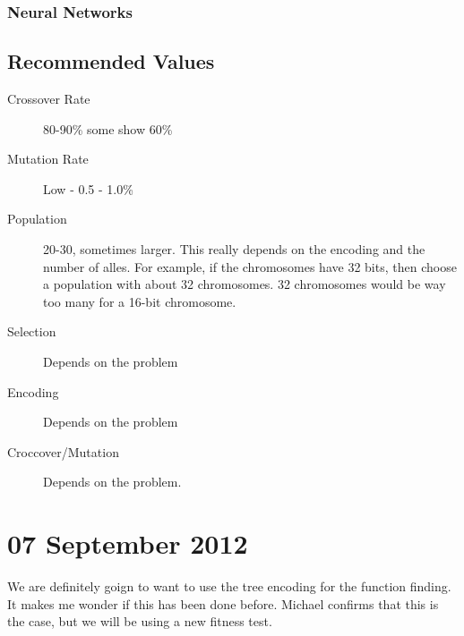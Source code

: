 \subsubsection{Neural Networks}
\label{subsubsec:neural}

\subsection{Recommended Values}
\begin{description}
\item[Crossover Rate] 80-90\% some show 60\%
\item[Mutation Rate] Low - 0.5 - 1.0\%
\item[Population] 20-30, sometimes larger. This really depends on the encoding 
  and the number of alles. For example, if the chromosomes have 32 bits, then 
  choose a population with about 32 chromosomes. 32 chromosomes would be way too 
  many for a 16-bit chromosome.
\item[Selection] Depends on the problem
\item[Encoding] Depends on the problem
\item[Croccover/Mutation] Depends on the problem.
\end{description}

\section{07 September 2012}
We are definitely goign to want to use the tree encoding for the function finding. 
It makes me wonder if this has been done before. Michael confirms that this is the 
case, but we will be using a new fitness test. 
